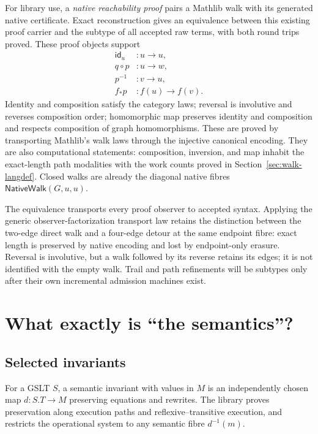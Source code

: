 \documentclass[11pt]{article}
\theoremstyle{remark}
\begin{document}
For library use, a \emph{native reachability proof} pairs a Mathlib walk with
its generated native certificate.  Exact reconstruction gives an equivalence
between this existing proof carrier and the subtype of all accepted raw
terms, with both round trips proved.  These proof objects support
\[
\begin{aligned}
  \mathsf{id}_u &: u\longrightarrow u,\\
  q\circ p &: u\longrightarrow w,\\
  p^{-1} &: v\longrightarrow u,\\
  f_*p &: f(u)\longrightarrow f(v).
\end{aligned}
\]
Identity and composition satisfy the category laws; reversal is involutive
and reverses composition order; homomorphic map preserves identity and
composition and respects composition of graph homomorphisms.  These are
proved by transporting Mathlib's walk laws through the injective canonical
encoding.  They are also computational statements: composition, inversion,
and map inhabit the exact-length path modalities with the work counts proved
in Section~\ref{sec:walk-langdef}.  Closed walks are already the diagonal
native fibres \(\mathsf{NativeWalk}(G,u,u)\).

The equivalence transports every proof observer to accepted syntax.  Applying
the generic observer-factorization transport law retains the distinction
between the two-edge direct walk and a four-edge detour at the same endpoint
fibre: exact length is preserved by native encoding and lost by endpoint-only
erasure.  Reversal is involutive, but a walk followed by its reverse retains
its edges; it is not identified with the empty walk.  Trail and path refinements will
be subtypes only after their own incremental admission machines exist.

\section{What exactly is ``the semantics''?}
\label{sec:semantics}

\subsection{Selected invariants}

For a GSLT \(S\), a semantic invariant with values in \(M\) is an independently
chosen map \(d:S.T\to M\) preserving equations and rewrites.  The library
proves preservation along execution paths and reflexive--transitive execution,
and restricts the operational system to any semantic fibre \(d^{-1}(m)\).
\end{document}

